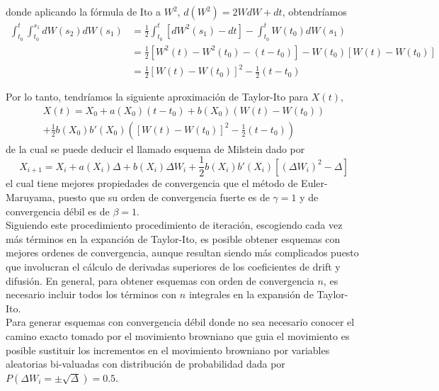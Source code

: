 \documentclass{article}
\begin{document}
donde aplicando la fórmula de Ito a  $W^2$, $d(W^2)=2W dW+ dt$, obtendríamos 
\begin{equation}\begin{aligned}
\int_{t_{0}}^{t} \int_{t_{0}}^{s_{1}} d W\left(s_{2}\right) d W\left(s_{1}\right)&=\frac{1}{2} \int_{t_{0}}^{t}\left[d W^{2}\left(s_{1}\right)-d t\right]-\int_{t_{0}}^{t} W\left(t_{0}\right) d W\left(s_{1}\right)\\
&=\frac{1}{2}\left[W^{2}(t)-W^{2}\left(t_{0}\right)-\left(t-t_{0}\right)\right]-W\left(t_{0}\right)\left[W(t)-W\left(t_{0}\right)\right]\\
&=\frac{1}{2}\left[W(t)-W\left(t_{0}\right)\right]^{2}-\frac{1}{2}\left(t-t_{0}\right)
\end{aligned}\end{equation}

\noindent
Por lo tanto, tendríamos la siguiente aproximación de Taylor-Ito para $X(t)$,
\begin{equation}\begin{aligned}
    X(t)=X_0 +a(X_0)(t-t_0)+b(X_0)(W(t)-W(t_0))\\+\frac{1}{2}b(X_0)b'(X_0)\left(\left[W(t)-W\left(t_{0}\right)\right]^{2}-\frac{1}{2}\left(t-t_{0}\right)\right)
\end{aligned}\end{equation}
de la cual se puede deducir el llamado esquema de Milstein dado por 
\begin{equation}
    X_{i+1}=X_i+a(X_i)\Delta+b(X_i)\Delta W_i+\frac{1}{2}b(X_i)b'(X_i)\left[(\Delta W_i)^2-\Delta\right]
\end{equation}
el cual tiene mejores propiedades de convergencia que el método de Euler-Maruyama, puesto que su orden de convergencia fuerte es de $\gamma=1$ y de convergencia débil es de $\beta=1$.\\

\noindent
Siguiendo este procedimiento procedimiento de iteración, escogiendo cada vez más términos en la expanción de Taylor-Ito, es posible obtener esquemas con mejores ordenes de convergencia, aunque resultan siendo más complicados puesto que involucran el cálculo de derivadas superiores de los coeficientes de drift y difusión. En general, para obtener esquemas con orden de convergencia $n$, es necesario incluir todos los términos con $n$ integrales en la expansión de Taylor-Ito. \\

\noindent
Para generar esquemas con convergencia débil donde no sea necesario conocer el camino exacto tomado por el movimiento browniano que guia el movimiento es posible sustituir los incrementos en el movimiento browniano por variables aleatorias bi-valuadas con distribución de probabilidad dada por $P(\Delta W_i=\pm\sqrt{\Delta})=0.5$.\\
\end{document}
